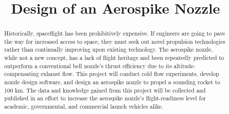 \documentclass[conference]{IEEEtran} %
\title{Design of an Aerospike Nozzle}
\author{
	\IEEEauthorblockN{%
		Hunter~Collins\IEEEauthorrefmark{1},  %
	}
	\IEEEauthorblockA{%
		RIT Space Exploration, Rochester Institute of Technology \\ %
		Rochester, N.Y. \\
		Email:
		\IEEEauthorrefmark{1}hwc8092@rit.edu
	}
	
}
\begin{document}
	\maketitle%
	
	\begin{abstract}
		Historically, spaceflight has been prohibitively expensive. If engineers are going to pave the way for increased access to space, they must seek out novel propulsion technologies rather than continually improving upon existing technology. The aerospike nozzle, while not a new concept, has a lack of flight heritage and been repeatedly predicted to outperform a conventional bell nozzle's thrust efficiency due to its altitude-compensating exhaust flow. This project will conduct cold flow experiments, develop nozzle design software, and design an aerospike nozzle to propel a sounding rocket to 100 km. The data and knowledge gained from this project will be collected and published in an effort to increase the aerospike nozzle's flight-readiness level for academic, governmental, and commercial launch vehicles alike.
	\end{abstract}
	
	\label{sec:nomenclature}
	\newcommand{\nomunit}[1]{%
		\renewcommand{\nomentryend}{\hspace*{\fill}#1}}
	\renewcommand{\nompreamble}{
		
	}
	
	\printnomenclature{}
	
\end{document}
